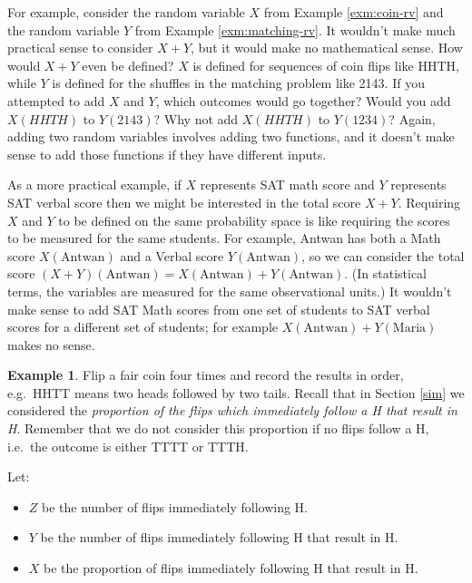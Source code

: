 \documentclass[
]{book}
\providecommand{\tightlist}{%
  \setlength{\itemsep}{0pt}\setlength{\parskip}{0pt}}
\theoremstyle{definition}
\theoremstyle{definition}
\newtheorem{example}{Example}[chapter]
\theoremstyle{definition}
\theoremstyle{remark}
\begin{document}
For example, consider the random variable \(X\) from Example \ref{exm:coin-rv} and the random variable \(Y\) from
Example \ref{exm:matching-rv}. It wouldn't make much practical sense to consider \(X+Y\), but it would make no mathematical sense. How would \(X+Y\) even be defined? \(X\) is defined for sequences of coin flips like HHTH, while \(Y\) is defined for the shuffles in the matching problem like 2143. If you attempted to add \(X\) and \(Y\), which outcomes would go together? Would you add \(X(HHTH)\) to \(Y(2143)\)? Why not add \(X(HHTH)\) to \(Y(1234)\)? Again, adding two random variables involves adding two functions, and it doesn't make sense to add those functions if they have different inputs.

As a more practical example, if \(X\) represents SAT math score and \(Y\) represents SAT verbal score then we might be interested in the total score \(X+Y\). Requiring \(X\) and \(Y\) to be defined on the same probability space is like requiring the scores to be measured for the same students. For example, Antwan has both a Math score \(X(\text{Antwan})\) and a Verbal score \(Y(\text{Antwan})\), so we can consider the total score \((X+Y)(\text{Antwan}) = X(\text{Antwan})+Y(\text{Antwan})\). (In statistical terms, the variables are measured for the same observational units.) It wouldn't make sense to add SAT Math scores from one set of students to SAT verbal scores for a different set of students; for example \(X(\text{Antwan}) + Y(\text{Maria})\) makes no sense.

\begin{example}
\protect\hypertarget{exm:mscoin-rv}{}{\label{exm:mscoin-rv} }
Flip a fair coin four times and record the results in order, e.g.~HHTT means two heads followed by two tails. Recall that in Section \ref{sim} we considered the \emph{proportion of the flips which immediately follow a H that result in H}. Remember that we do not consider this proportion if no flips follow a H, i.e.~the outcome is either TTTT or TTTH.

Let:

\begin{itemize}
\tightlist
\item
  \(Z\) be the number of flips immediately following H.
\item
  \(Y\) be the number of flips immediately following H that result in H.
\item
  \(X\) be the proportion of flips immediately following H that result in H.
\end{itemize}
\end{example}
\end{document}
